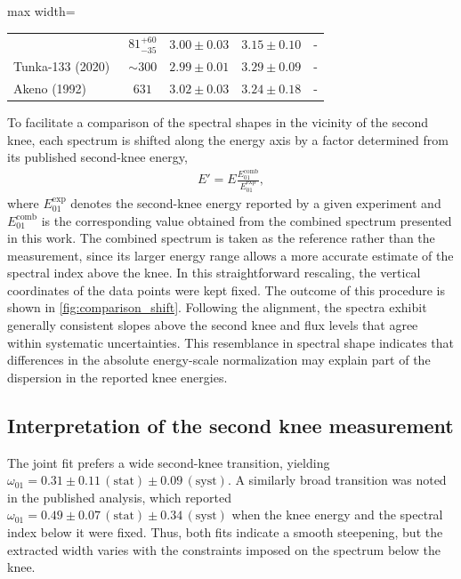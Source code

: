 \documentclass[main.tex]{subfiles}
\begin{document}
\begin{table}
\begin{adjustbox}{max width=\textwidth}
\begin{tabular}{@{}lcccc@{}}
        & $81^{+60}_{-35}$
        & $3.00\pm0.03$
        & $3.15\pm0.10$
        & - \\
        Tunka-133 (2020)~\cite{Budnev:2020:Tunka133}
        & $\sim300$
        & $2.99\pm0.01$
        & $3.29\pm0.09$
        & - \\
        \rowcolor{gray!10}
        Akeno (1992)~\cite{Nagano:1992:Akeno}
        & $631$
        & $3.02\pm0.03$
        & $3.24\pm0.18$
        & - \\
        \bottomrule
    \end{tabular}
    \end{adjustbox}
\end{table}


To facilitate a comparison of the spectral shapes in the vicinity of the second knee, each spectrum is shifted along the energy axis by a factor determined from its published second-knee energy,
\begin{align}
    E'=E\frac{E_{01}^{\mathrm{comb}}}{E_{01}^{\mathrm{exp}}},
\end{align}
where $E_{01}^{\mathrm{exp}}$ denotes the second-knee energy reported by a given experiment and $E_{01}^{\mathrm{comb}}$ is the corresponding value obtained from the combined spectrum presented in this work.
The combined spectrum is taken as the reference rather than the  measurement, since its larger energy range allows a more accurate estimate of the spectral index above the knee.
In this straightforward rescaling, the vertical coordinates of the data points were kept fixed.
The outcome of this procedure is shown in \cref{fig:comparison_shift}.
Following the alignment, the spectra exhibit generally consistent slopes above the second knee and flux levels that agree within systematic uncertainties.
This resemblance in spectral shape indicates that differences in the absolute energy-scale normalization may explain part of the dispersion in the reported knee energies.

\subsection{Interpretation of the second knee measurement}

The joint fit prefers a wide second-knee transition, yielding $\omega_{01}=0.31\pm0.11\,\mathrm{(stat)}\pm0.09\,\mathrm{(syst)}$.
A similarly broad transition was noted in the published  analysis, which reported $\omega_{01}=0.49\pm0.07\,\mathrm{(stat)}\pm0.34\,\mathrm{(syst)}$ when the knee energy and the spectral index below it were fixed.
Thus, both fits indicate a smooth steepening, but the extracted width varies with the constraints imposed on the spectrum below the knee.
\end{document}
